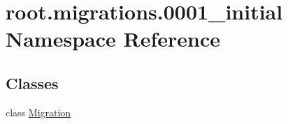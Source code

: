 \hypertarget{namespaceroot_1_1migrations_1_10001__initial}{\section{root.\-migrations.0001\-\_\-initial Namespace Reference}
\label{namespaceroot_1_1migrations_1_10001__initial}
}
\subsection*{Classes}
\begin{DoxyCompactItemize}
\item 
class \hyperlink{classroot_1_1migrations_1_10001__initial_1_1_migration}{Migration}
\end{DoxyCompactItemize}
